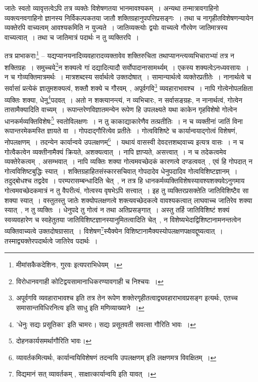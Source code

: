 			जातेः स्वतो व्यावृत्तत्वेऽपि तत्र व्यक्तेः विशेषणतया भानमावश्यकम्~। अन्यथा तन्मात्रावगाहिनो व्यक्त्यनवगाहिनो ज्ञानस्य निर्विकल्पकतया जातौ शक्तिग्रहानुपपत्तिप्रसङ्गः~। तथा च नागृहीतविशेषणन्यायेन व्यक्तेरपि वाच्यत्वम् आवश्यकमिति न युज्यते~। जातिव्यक्त्योः द्वयोः वाच्यत्वे गौरवेण जातिमात्रस्य वाच्यत्वात्~। तथा च जातिमात्रं पदार्थः न तु व्यक्तिरपि~।

			\begin{small}	

				तत्र प्राभाकराः\footnote{मीमांसकैकदेशिनः, गुरवः इत्यपराभिधेयम्~।} – यद्यप्यानयनादिव्यवहारादव्यक्तावेव शक्तिरुचिता तथाप्यानन्त्यव्यभिचाराभ्यां तत्र न शक्तिग्रहः~। समुच्चये\footnote{विरोधानवगाही कोटिद्वयसामानाधिकरण्यावगाही च निश्चयः~।}न शक्यत्वे गां दद्यादित्यादौ सर्वोपादानासामर्थ्यम्~। एकस्य शक्यत्वेऽनध्यवसायः~। न च गोव्यक्तिमात्रमर्थः~। मात्रशब्दस्य सर्वार्थत्वे उक्तदोषात्~। सामान्यार्थत्वे व्यक्तेरप्रतीतेः~। नानार्थत्वे च सर्वासां प्रत्येकं ज्ञातुमशक्यत्वं, शक्तौ शक्ये च गौरवम्~, अपूर्वगवि\footnote{अपूर्वगवि व्यवहाराभावश्च इति तत्र तेन रूपेण शक्तेरगृहीतत्वाद्व्यवहाराभावप्रसङ्ग इत्यर्थः, एतच्च समासान्तविधिरनित्य इति साधु इति मणिव्याख्याने~।} व्यवहाराभावश्च~। नापि गोत्वेनोपलक्षिता व्यक्तिः शक्या, धेनु\footnote{’धेनुः सद्यः प्रसूतिका’ इति चामरः। सद्यः प्रसूतवती सवत्सा गौरिति भावः~।}पदवत्~। अतो न शक्त्यानन्त्यं, न व्यभिचारः, न सर्वासङ्ग्रहः, न नानार्थत्वं, गोत्वेन तासामैक्यादिति वाच्यम्~। रूपान्तरेणविज्ञातमन्येन रूपेण हि उपलक्ष्यते यथा काकेन गृहविशेषो गोत्वेन धानकर्मव्यक्तिविशेषः\footnote{दोहनकार्यसमर्थागौरिति भावः।} स्वतोविलक्षणः~। न तु काकाद्याकारेणैव तत्प्रतीतिः~। न च व्यक्तीनां जातिं विना रूपान्तरमेकमस्ति ज्ञायते वा~। गोपदाद्गौरित्येव प्रतीतेः~। गोत्वविशिष्टे च कार्यान्वयाद्गोत्वं विशेषणं, नोपलक्षणम्~। तदन्येन कार्यान्वये उपलक्षणम्\footnote{व्यावर्तकमित्यर्थः, कार्यान्वयिविशेषणं तदन्वयि उपलक्षणम् इति लक्षणमत्र विवक्षितम्~।}~। यथायं वासस्वी देवदत्तशब्दवाच्य इत्यत्र वासः~। न च गोत्वैकत्वेन व्यक्तीनामैक्यं क्रियते, अशक्यत्वात्~। नापि ज्ञाप्यते, असत्त्वात्~। न च तदेकत्वमेव व्यक्तेरेकत्वम्~, असम्भवात्~। नापि व्यक्तिः शक्या गोत्वमवच्छेदकं कारणत्वे दण्डत्ववत्~, एवं हि गोपदात् न गोत्वविशिष्टबुद्धिः स्यात्~। शक्तिग्रहाहितसंस्कारसचिवात् गोपदादेव धेनुपदादिव गोत्वविशिष्टज्ञानम्~। तदुद्बोधश्च तद्वदेव~। परम्परासम्बन्धादिति चेत्~, न तत्र हि धानकर्मव्यक्तिविशेषस्यावश्यशक्यवेऽनुगमाय गोत्वमवच्छेदकमात्रं न तु वैपरीत्यं, गोत्वस्य वृषभेऽपि सत्त्वात्~। इह तु व्यक्तिरप्रसक्तेति जातिविशिष्टैव सा शक्या स्यात्~। वस्तुतस्तु जातेः शक्योपलक्षणत्वे शक्त्यवच्छेदकत्वे वावश्यकत्वात् लाघवाच्च जातिरेव शक्या स्यात्~, न तु व्यक्तिः~। धेनुपदे तु गोत्वं न तथा अतिप्रसङ्गात्~। अस्तु तर्हि जातिविशिष्टं शक्यं स्वव्यवहारेण च स्वहेतुतया जातिविशिष्टज्ञानस्यानुमितत्वादिति चेत्~, न विशेष्यभेदाद्विशिष्टानामनन्तत्वेन व्यक्तिवाच्यत्वे उक्तदोषग्रासात्~। विशेषण\footnote{विद्यमानं सत् व्यावर्तकम् , साक्षात्कार्यान्वयि इति यावत्~।}स्यैक्येन विशिष्टानामैक्यस्योपलक्षणपक्षवद्दूष्यत्वात्~। तस्माद्व्यक्तेरपदार्थत्वे जातिरेव पदार्थः~।


\end{small}
